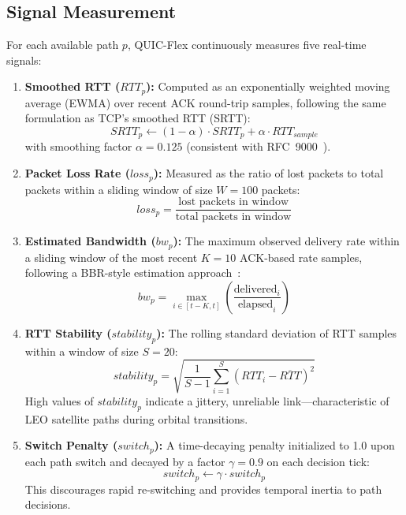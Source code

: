 \documentclass[conference,10pt]{IEEEtran}
\begin{document}
\subsection{Signal Measurement}
\label{sec:signals}

For each available path $p$, QUIC-Flex continuously measures five real-time signals:

\begin{enumerate}
    \item \textbf{Smoothed RTT ($RTT_p$):}
    Computed as an exponentially weighted moving average (EWMA) over recent ACK round-trip samples, following the same formulation as TCP's smoothed RTT (SRTT):
    \begin{equation}
    SRTT_p \leftarrow (1 - \alpha) \cdot SRTT_p + \alpha \cdot RTT_{sample}
    \label{eq:ewma}
    \end{equation}
    with smoothing factor $\alpha = 0.125$ (consistent with RFC~9000~\cite{rfc9369}).

    \item \textbf{Packet Loss Rate ($loss_p$):}
    Measured as the ratio of lost packets to total packets within a sliding window of size $W = 100$ packets:
    \begin{equation}
    loss_p = \frac{\text{lost packets in window}}{\text{total packets in window}}
    \label{eq:loss}
    \end{equation}

    \item \textbf{Estimated Bandwidth ($bw_p$):}
    The maximum observed delivery rate within a sliding window of the most recent $K = 10$ ACK-based rate samples, following a BBR-style estimation approach~\cite{wu2025bbr3}:
    \begin{equation}
    bw_p = \max_{i \in [t-K, t]} \left( \frac{\text{delivered}_i}{\text{elapsed}_i} \right)
    \label{eq:bw}
    \end{equation}

    \item \textbf{RTT Stability ($stability_p$):}
    The rolling standard deviation of RTT samples within a window of size $S = 20$:
    \begin{equation}
    stability_p = \sqrt{\frac{1}{S-1} \sum_{i=1}^{S} (RTT_i - \overline{RTT})^2}
    \label{eq:stability}
    \end{equation}
    High values of $stability_p$ indicate a jittery, unreliable link—characteristic of LEO satellite paths during orbital transitions.

    \item \textbf{Switch Penalty ($switch_p$):}
    A time-decaying penalty initialized to 1.0 upon each path switch and decayed by a factor $\gamma = 0.9$ on each decision tick:
    \begin{equation}
    switch_p \leftarrow \gamma \cdot switch_p
    \label{eq:switch}
    \end{equation}
    This discourages rapid re-switching and provides temporal inertia to path decisions.
\end{enumerate}
\end{document}
